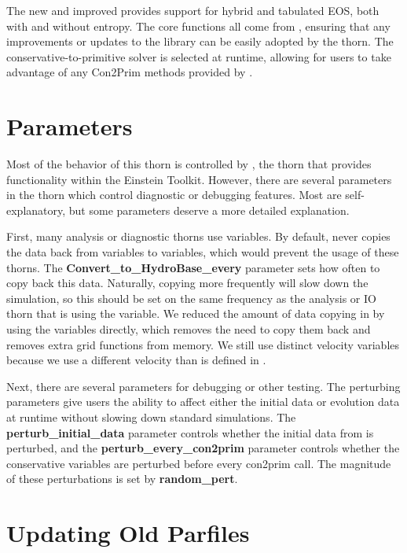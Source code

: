 \documentclass{article}
\begin{document}
The new and improved \igm{} provides support for hybrid and
tabulated EOS, both with and without entropy. The core functions
all come from \glib, ensuring that any improvements or updates
to the library can be easily adopted by the thorn. The
conservative-to-primitive solver is selected at runtime, allowing
for users to take advantage of any Con2Prim methods provided by \grhayl.

\section{Parameters}

Most of the behavior of this thorn is controlled by \glib,
the thorn that provides \grhayl{} functionality
within the Einstein Toolkit. However, there are several
parameters in the thorn which control diagnostic or debugging
features. Most are self-explanatory, but some parameters deserve
a more detailed explanation.

First, many analysis or diagnostic thorns use \hydrobase{} variables.
By default, \igm{} never copies the data back from \igm{} variables
to \hydrobase{} variables, which would prevent the usage of these
thorns. The \textbf{Convert\_to\_HydroBase\_every} parameter
sets how often to copy back this data. Naturally, copying more
frequently will slow down the simulation, so this should be set
on the same frequency as the analysis or IO thorn that is using
the \hydrobase{} variable. We reduced the amount of data copying in \igm{}
by using the \hydrobase{} variables directly, which removes the need
to copy them back and removes extra grid functions from memory.
We still use distinct velocity variables because we use a different
velocity than is defined in \hydrobase.

Next, there are several parameters for debugging or other testing.
The perturbing parameters give users the ability to affect either
the initial data or evolution data at runtime without slowing down
standard simulations. The \textbf{perturb\_initial\_data} parameter
controls whether the initial data from \hydrobase{} is perturbed, and
the \textbf{perturb\_every\_con2prim} parameter controls whether
the conservative variables are perturbed before every con2prim call.
The magnitude of these perturbations is set by \textbf{random\_pert}.

\section{Updating Old Parfiles}
\end{document}
